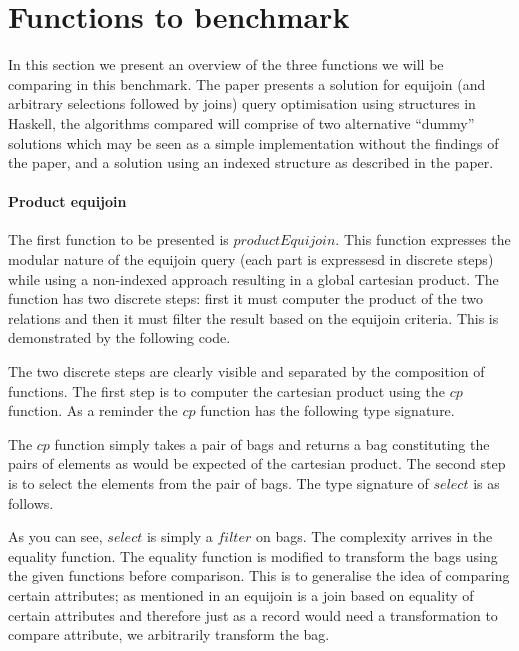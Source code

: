 \section{Functions to benchmark}
In this section we present an overview of the three functions we will
be comparing in this benchmark. The paper \relalg{} presents a solution for
equijoin (and arbitrary selections followed by joins) query optimisation using
structures in Haskell, the algorithms compared will comprise of two alternative
``dummy'' solutions which may be seen as a simple implementation without the
findings of the paper, and a solution using an indexed structure as described
in the paper.

\paragraph{Product equijoin} The first function to be presented is
$productEquijoin$. This function
expresses the modular nature of the equijoin query (each part is expressesd in
discrete steps) while using a non-indexed approach resulting in a global
cartesian product.
The function has two discrete steps: first it must computer the product of the
two relations and then it must filter the result based on the equijoin criteria.
This is demonstrated by the following code.



\noindent
The two discrete steps are clearly visible and separated by the composition of
functions. The first step is to computer the cartesian product using the
$cp$ function. As a reminder the $cp$ function has
the following type signature.


\noindent
The $cp$ function simply takes a pair of bags and
returns a bag constituting the pairs of elements as would be expected of the
cartesian product. The second step is to select the elements from the pair of
bags. The type signature of $select$ is as follows.


\noindent
As you can see, $select$ is simply a
$filter$ on bags. The complexity arrives in the
equality function. The equality function is modified to transform the bags using
the given functions before comparison. This is to generalise the idea of
comparing certain attributes; as mentioned in  an
equijoin is a join based on equality of certain attributes and therefore just as
a record would need a transformation to compare attribute, we arbitrarily
transform the bag.

